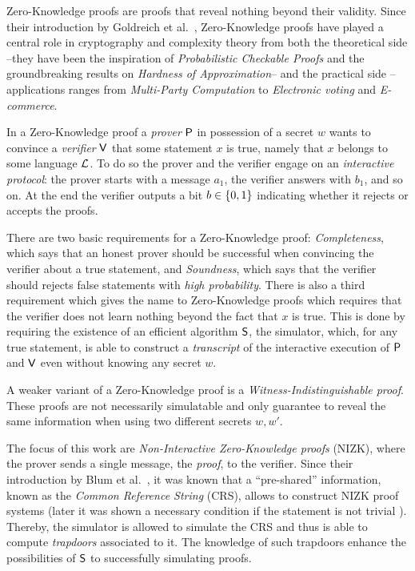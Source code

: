 Zero-Knowledge proofs are proofs that reveal nothing beyond their validity. Since their introduction by Goldreich et al.~\cite{GolMicRac89}, Zero-Knowledge proofs have played a central role in cryptography and complexity theory from both the theoretical side --they have been the inspiration of \emph{Probabilistic Checkable Proofs} and the groundbreaking results on \emph{Hardness of Approximation}-- and the practical side --applications ranges from \emph{Multi-Party Computation} to \emph{Electronic voting} and \emph{E-commerce}.

In a Zero-Knowledge proof a \emph{prover} $\mathsf{P}$ in possession of a secret $w$ wants to convince a \emph{verifier} $\mathsf{V}$ that some statement $x$ is true, namely that $x$ belongs to some language $\mathcal{L}$. To do so the prover and the verifier engage on an \emph{interactive protocol}: the prover starts with a message $a_1$, the verifier answers with $b_1$, and so on. At the end the verifier outputs a bit $b\in\{0,1\}$ indicating whether it rejects or accepts the proofs.

There are two basic requirements for a Zero-Knowledge proof: \emph{Completeness}, which says that an honest prover should be successful when convincing the verifier about a true statement, and \emph{Soundness}, which says that the verifier should rejects false statements with \emph{high probability}. There is also a third requirement which  gives the name to Zero-Knowledge proofs which requires that the verifier does not learn nothing beyond the fact that $x$ is true. This is done by requiring the existence of an efficient algorithm $\mathsf{S}$, the simulator, which, for any true statement, is able to construct a \emph{transcript} of the interactive execution of $\mathsf{P}$ and $\mathsf{V}$ even without knowing any secret $w$.

A weaker variant of a Zero-Knowledge proof is a \emph{Witness-Indistinguishable proof}. These proofs are not necessarily simulatable and only guarantee to reveal the same information when using two different secrets $w,w'$. 

The focus of this work are \emph{Non-Interactive Zero-Knowledge proofs} (NIZK), where the prover sends a single message, the \emph{proof}, to the verifier. Since their introduction by Blum et al.~\cite{STOC:BluFelMic88}, it was known that a ``pre-shared'' information, known as the \emph{Common Reference String} (CRS), allows to construct NIZK proof systems (later it was shown a necessary condition if the statement is not trivial \cite{JC:GolOre94}). Thereby, the simulator is allowed to simulate the CRS and thus is able to compute \emph{trapdoors} associated to it. The knowledge of such trapdoors enhance the possibilities of $\mathsf{S}$ to successfully simulating proofs.

